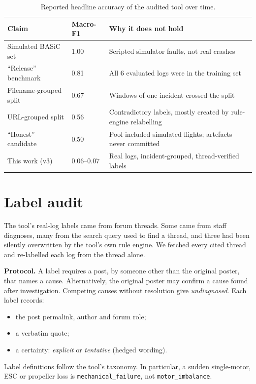 \documentclass[10pt,a4paper]{article}
\begin{document}
\begin{table}[h]\centering\small
\caption{Reported headline accuracy of the audited tool over time.}
\label{tab:history}
\begin{tabular}{p{3.4cm}p{1.3cm}p{9.6cm}}
\toprule
Claim & Macro-F1 & Why it does not hold\\\midrule
Simulated BASiC set & 1.00 & Scripted simulator faults, not real crashes\\
``Release'' benchmark & 0.81 & All 6 evaluated logs were in the training set\\
Filename-grouped split & 0.67 & Windows of one incident crossed the split\\
URL-grouped split & 0.56 & Contradictory labels, mostly created by rule-engine relabelling\\
``Honest'' candidate & 0.50 & Pool included simulated flights; artefacts never committed\\
This work (v3) & 0.06--0.07 & Real logs, incident-grouped, thread-verified labels\\
\bottomrule
\end{tabular}
\end{table}

\section{Label audit}\label{sec:audit}
The tool's real-log labels came from forum threads. Some came from staff
diagnoses, many from the search query used to find a thread, and three had
been silently overwritten by the tool's own rule engine. We fetched every
cited thread and re-labelled each log from the thread alone.

\textbf{Protocol.} A label requires a post, by someone other than the
original poster, that names a cause. Alternatively, the original poster may
confirm a cause found after investigation. Competing causes without
resolution give \emph{undiagnosed}. Each label records:
\begin{itemize}
\item the post permalink, author and forum role;
\item a verbatim quote;
\item a certainty: \emph{explicit} or \emph{tentative} (hedged wording).
\end{itemize}
Label definitions follow the tool's taxonomy. In particular, a sudden
single-motor, ESC or propeller loss is \texttt{mechanical\_failure}, not
\texttt{motor\_imbalance}.
\end{document}
